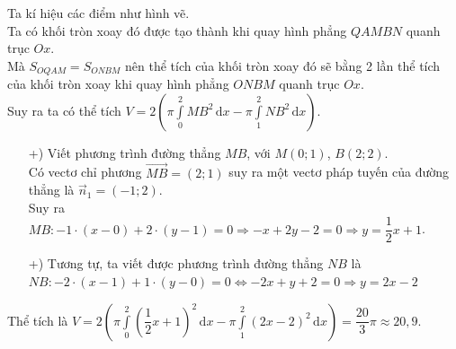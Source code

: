 \begin{ex}
{		Ta kí hiệu các điểm như hình vẽ.\\
		Ta có khối tròn xoay đó được tạo thành khi quay hình phẳng $QAMBN$ quanh trục $Ox$.\\
		Mà $S_{OQAM}=S_{ONBM}$ nên thể tích của khối tròn xoay đó sẽ bằng 2 lần thể tích của khối tròn xoay khi quay hình phẳng $ONBM$ quanh trục $Ox$.\\
		Suy ra ta có thể tích $V=2\left(\pi\displaystyle\int\limits_0^2 MB^2 \mathrm{\,d}x -\pi\displaystyle\int\limits_1^2 NB^2 \mathrm{\,d}x\right)$.
		\begin{itemize}
			\item[+)] Viết phương trình đường thẳng $MB$, với $M(0;1)$, $B(2;2)$.\\
			Có vectơ chỉ phương $\overrightarrow{MB}=(2;1)$ suy ra một vectơ pháp tuyến của đường thẳng là $\overrightarrow{n}_1=(-1;2)$.\\
			Suy ra $MB\colon -1\cdot(x-0)+2\cdot(y-1)=0 \Rightarrow -x+2y-2=0 \Rightarrow y=\dfrac{1}{2}x+1$.
			\item[+)] Tương tự, ta viết được phương trình đường thẳng $NB$ là\\
			$NB\colon -2\cdot(x-1)+1\cdot(y-0)=0 \Leftrightarrow -2x+y+2=0 \Rightarrow y=2x-2$
		\end{itemize}
		Thể tích là $V=2\left(\pi\displaystyle\int\limits_0^2 \left(\dfrac{1}{2}x+1\right)^2 \mathrm{\,d}x -\pi\displaystyle\int\limits_1^2 \left(2x-2\right)^2 \mathrm{\,d}x\right) =\dfrac{20}{3}\pi \approx 20{,}9$.
		}
\end{ex}

